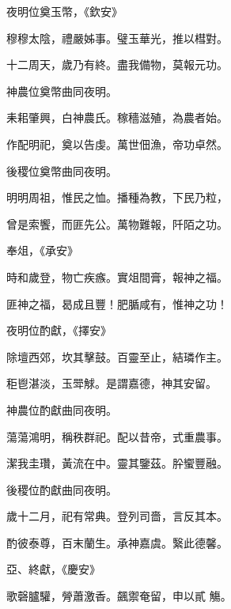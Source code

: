 \begin{pinyinscope}
 夜明位奠玉幣，《欽安》



 穆穆太陰，禮嚴姊事。璧玉華光，推以槥對。



 十二周天，歲乃有終。盡我備物，莫報元功。



 神農位奠幣曲同夜明。



 耒耜肇興，白神農氏。稼穡滋殖，為農者始。



 作配明祀，奠以告虔。萬世佃漁，帝功卓然。



 後稷位奠幣曲同夜明。



 明明周祖，惟民之恤。播種為教，下民乃粒，



 曾是索饗，而匪先公。萬物難報，阡陌之功。



 奉俎，《承安》



 時和歲登，物亡疾瘯。實俎間膏，報神之福。



 匪神之福，曷成且豐！肥腯咸有，惟神之功！



 夜明位酌獻，《擇安》



 除壇西郊，坎其擊鼓。百靈至止，結璘作主。



 秬鬯湛淡，玉斝觩。是謂嘉德，神其安留。



 神農位酌獻曲同夜明。



 蕩蕩鴻明，稱秩群祀。配以昔帝，式重農事。



 潔我圭瓚，黃流在中。靈其鑒茲。肸蠁豐融。



 後稷位酌獻曲同夜明。



 歲十二月，祀有常典。登列司嗇，言反其本。



 酌彼泰尊，百末蘭生。承神嘉虞。繄此德馨。



 亞、終獻，《慶安》



 歌磬臚驩，膋蕭激香。飆禦奄留，申以貳
 觴。




\end{pinyinscope}
